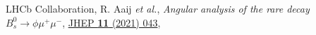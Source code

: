 \begin{cvcontent}
\begin{enumerate}[label={[\arabic*]}, leftmargin=1.5cm]
    \sloppy
    \item LHCb Collaboration, R. Aaij \emph{et al.}, 
    \emph{Angular analysis of the rare decay $B_s^0 \to \phi \mu^+ \mu^-$},
    \href{http://dx.doi.org/10.1007/JHEP11(2021)043}{JHEP \textbf{11} (2021) 043},
  \end{enumerate}
\end{cvcontent}